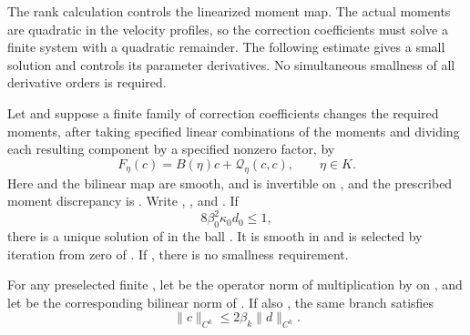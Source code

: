 The rank calculation controls the linearized moment map. The actual moments are quadratic in the
velocity profiles, so the correction coefficients must solve a finite system with a quadratic
remainder. The following estimate gives a small solution and controls its parameter derivatives.
No simultaneous smallness of all derivative orders is required.

\begin{lemma}\label{lem:A.2}
Let  and suppose a finite family of correction coefficients
 changes the required moments, after taking specified linear
combinations of the moments and dividing each resulting component by a specified nonzero factor,
by
\begin{equation}
F_\eta(c)=B(\eta)c+\mathcal Q_\eta(c,c),
\qquad \eta\in K.
\tag{A.2}\label{eq:A.2}
\end{equation}
Here  and the bilinear map  are smooth, and
 is invertible on , and the prescribed moment
discrepancy is . Write
,
, and
. If
\[
8\beta_0^2\kappa_0d_0\le1,
\]
there is a unique solution of  in the ball
. It is smooth in
 and is selected by iteration from zero of
. If
, there is no smallness requirement.

For any preselected finite , let  be the
operator norm of multiplication by  on
, and let  be the corresponding
bilinear norm of . If also
, the same branch satisfies
\begin{equation}
\lVert c\rVert_{C^k}\le2\beta_k\lVert d\rVert_{C^k}.
\tag{A.3}\label{eq:A.3}
\end{equation}
\end{lemma}

